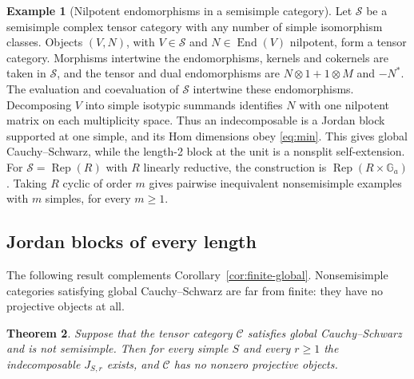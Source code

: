 \documentclass[11pt,reqno]{amsart}
\newtheorem{theorem}{Theorem}[section]
\theoremstyle{definition}
\newtheorem{example}[theorem]{Example}
\newcommand{\End}{\operatorname{End}}
\newcommand{\C}{\mathcal C}
\newcommand{\Ga}{\mathbb G_a}
\newcommand{\Rep}{\operatorname{Rep}}
\begin{document}
\begin{example}[Nilpotent endomorphisms in a semisimple category]\label{ex:nil}
Let $\mathcal S$ be a semisimple complex tensor category with any number
of simple isomorphism classes. Objects $(V,N)$, with $V\in\mathcal S$
and $N\in\End(V)$ nilpotent, form a tensor category. Morphisms intertwine
the endomorphisms, kernels and cokernels are taken in $\mathcal S$, and
the tensor and dual endomorphisms are $N\otimes1+1\otimes M$ and $-N^*$.
The evaluation and coevaluation of $\mathcal S$ intertwine these
endomorphisms. Decomposing $V$ into simple isotypic summands identifies
$N$ with one nilpotent matrix on each multiplicity space. Thus an
indecomposable is a Jordan block supported at one simple, and its Hom
dimensions obey \eqref{eq:min}. This gives global Cauchy--Schwarz, while
the length-2 block at the unit is a nonsplit self-extension.
For $\mathcal S=\Rep(R)$ with $R$ linearly reductive, the construction is
$\Rep(R\times\Ga)$. Taking $R$ cyclic of order $m$ gives pairwise
inequivalent nonsemisimple examples with $m$ simples, for every $m\ge1$.
\end{example}

\subsection{Jordan blocks of every length}
The following result complements Corollary~\ref{cor:finite-global}. Nonsemisimple categories satisfying global Cauchy--Schwarz are far from finite: they have no projective objects at all.
\begin{theorem}\label{thm:unbounded}
Suppose that the tensor category $\C$ satisfies global Cauchy--Schwarz and is not semisimple. Then for every simple $S$ and every $r\geq1$ the indecomposable $J_{S,r}$ exists, and $\C$ has no nonzero projective objects.
\end{theorem}
\end{document}
